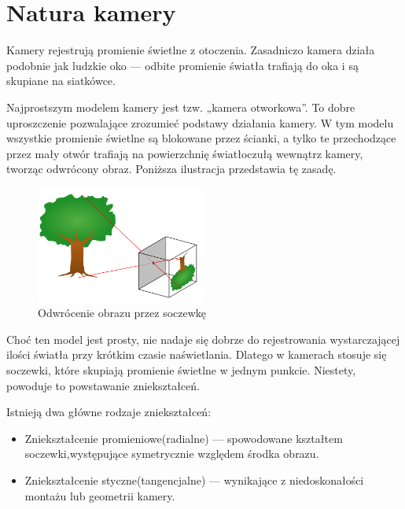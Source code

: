 \documentclass[magisterska]{pracadypl}
\begin{document}
\chapter{Natura kamery}

Kamery rejestrują promienie świetlne z otoczenia. Zasadniczo kamera działa podobnie jak ludzkie oko — odbite promienie światła trafiają do oka i są skupiane na siatkówce.

Najprostszym modelem kamery jest tzw. „kamera otworkowa”. To dobre uproszczenie pozwalające zrozumieć podstawy działania kamery. W tym modelu wszystkie promienie świetlne są blokowane przez ścianki, a tylko te przechodzące przez mały otwór trafiają na powierzchnię światłoczułą wewnątrz kamery, tworząc odwrócony obraz. Poniższa ilustracja przedstawia tę zasadę.

\begin{figure}[H]
    \centering
    \includegraphics[width=0.5\textwidth]{images/light.png}
    \captionsetup{font=footnotesize}
    \caption[Odwrócenie obrazu przez soczewkę. https://funsizephysics.com/use-light-turn-world-upside/]{Odwrócenie obrazu przez soczewkę}
    \label{fig:rpi}
\end{figure}

Choć ten model jest prosty, nie nadaje się dobrze do rejestrowania wystarczającej ilości światła przy krótkim czasie naświetlania. Dlatego w kamerach stosuje się soczewki, które skupiają promienie świetlne w jednym punkcie. Niestety, powoduje to powstawanie zniekształceń.

Istnieją dwa główne rodzaje zniekształceń:

\begin{itemize}
  \item Zniekształcenie promieniowe(radialne) — spowodowane kształtem soczewki,występujące symetrycznie względem środka obrazu.

  \item Zniekształcenie styczne(tangencjalne) — wynikające z niedoskonałości montażu lub geometrii kamery.
\end{itemize}
\end{document}
